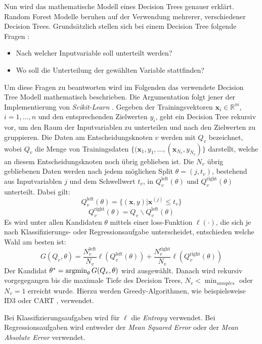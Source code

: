 Nun wird das mathematische Modell eines Decision Trees genauer erkl\"art. Random Forest Modelle beruhen auf der Verwendung mehrerer, verschiedener Decision Trees.
Grunds\"atzlich stellen sich bei einem Decision Tree folgende Fragen \cite[Seiten 251 bis 253]{shalev}:
\begin{itemize}
	\item Nach welcher Inputvariable soll unterteilt werden?
	\item Wo soll die Unterteilung der gew\"ahlten Variable stattfinden?
\end{itemize}

Um diese Fragen zu beantworten wird im Folgenden das verwendete Decision Tree Modell mathematisch beschrieben. Die Argumentation folgt jener der Implementierung von \textit{Scikit-Learn} \cite{sklearn}.
Gegeben der Trainingsvektoren $\mathbf{x}_i \in \mathbb{R}^m$, $i=1,\dots ,n$ und den entsprechenden Zielwerten $y_i$, geht ein Decision Tree rekursiv vor, um den
Raum der Inputvariablen zu unterteilen und nach den Zielwerten zu gruppieren. Die Daten am Entscheidungsknoten $v$ werden mit
$Q_v$ bezeichnet, wobei $Q_v$ die Menge von Trainingsdaten $\{(\mathbf{x}_1, y_1, \dots , (\mathbf{x}_{N_v}, y_{N_v})\}$ darstellt, welche an diesem
Entscheidungsknoten noch \"ubrig geblieben ist. Die $N_v$ \"ubrig
gebliebenen Daten werden nach jedem m\"oglichen
Split $\theta = (j, t_v)$, bestehend aus Inputvariablen $j$ und dem Schwellwert $t_v$, in $Q_v^{\text{left}}(\theta)$ und $Q_v^{\text{right}}(\theta)$ unterteilt. Dabei gilt:
$$ Q_v^{\text{left}}(\theta) = \{ (\mathbf{x},y) | \mathbf{x}^{(j)} \leq t_v \} $$
$$ Q_v^{\text{right}}(\theta) = Q_v \backslash Q_v^{\text{left}}(\theta) $$
Es wird unter allen Kandidaten $\theta$ mittels einer loss-Funktion $\ell(\cdot)$, die sich je nach Klassifizierungs- oder Regressionsaufgabe unterscheidet, entschieden
welche Wahl am besten ist:
$$ G(Q_v, \theta) = \frac{N_v^{\text{left}}}{N_v}\ell(Q_v^{\text{left}}(\theta)) + \frac{N_v^{\text{right}}}{N_v}\ell(Q_v^{\text{right}}(\theta)) $$
Der Kandidat $\theta^* = \operatorname*{argmin}_{\theta}G(Q_v, \theta)$ wird ausgew\"ahlt. Danach wird rekursiv vorgegegangen bis die maximale Tiefe des Decision Trees,
$N_v < \operatorname{min}_{samples}$ oder $N_v = 1$ erreicht wurde. Hierzu werden Greedy-Algorithmen, wie beispielsweise ID3 \cite{ID3} oder CART \cite{breiman1984classification}, verwendet.

Bei Klassifizierungsaufgaben wird f\"ur $\ell$ die \textit{Entropy} verwendet. Bei Regressionsaufgaben wird entweder der \textit{Mean Squared Error} oder
der \textit{Mean Absolute Error} verwendet.

